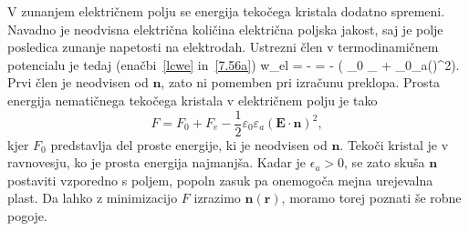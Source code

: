 V zunanjem električnem polju se energija tekočega kristala dodatno spremeni. 
Navadno je neodvisna električna količina električna poljska jakost, saj je polje posledica
zunanje napetosti na elektrodah. Ustrezni člen v termodinamičnem
potencialu je tedaj (enačbi~\ref{lcwe} in~\ref{7.56a})
\beq
w_{el} = - \cdot{} = - 
\left( \varepsilon_0 \varepsilon_\bot {}\cdot{} + 
\varepsilon_{0}\varepsilon_{a}(\cdot{})^{2}\right).
\eeq
Prvi člen je neodvisen od $\mathbf{n}$, zato ni pomemben pri izračunu
preklopa. Prosta energija
nematičnega tekočega kristala v električnem polju je tako 
\begin{equation}
F=F_{0}+F_{e}-\frac{1}{2}\varepsilon_{0}\varepsilon_{a}
(\mathbf{E}\cdot \mathbf{n})^{2},
\label{7.72}
\end{equation}
 kjer $F_{0}$ predstavlja del proste energije, ki je neodvisen od $\mathbf{n}$.
Tekoči kristal je v ravnovesju, ko je prosta energija najmanjša. Kadar je
$\epsilon_{a}>0$, se zato skuša $\mathbf{n}$ postaviti vzporedno s
poljem, popoln zasuk pa onemogoča mejna urejevalna plast. 
Da lahko z minimizacijo $F$ izrazimo $\mathbf{n}(\mathbf{r})$, moramo
torej poznati še robne pogoje.

